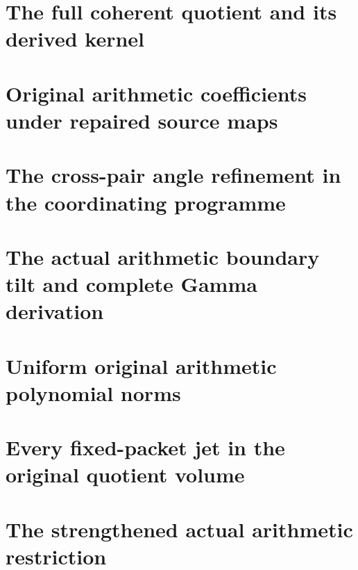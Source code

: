 \chapter{The full coherent quotient and its derived kernel}


\chapter{Original arithmetic coefficients under repaired source maps}


\chapter{The cross-pair angle refinement in the coordinating programme}

\chapter{The actual arithmetic boundary tilt and complete Gamma derivation}

\chapter{Uniform original arithmetic polynomial norms}

\chapter{Every fixed-packet jet in the original quotient volume}



\chapter{The strengthened actual arithmetic restriction}

